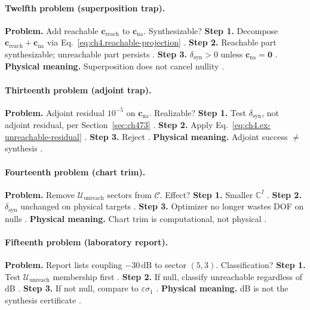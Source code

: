 \paragraph{Twelfth problem (superposition trap).}
\textbf{Problem.} Add reachable \(\mathbf{c}_{\mathrm{reach}}\) to \(\mathbf{c}_{\mathrm{na}}\). Synthesizable?
\textbf{Step 1.} Decompose \(\mathbf{c}_{\mathrm{reach}}+\mathbf{c}_{\mathrm{na}}\) via Eq.~\eqref{eq:ch4.reachable-projection} \cite{harrington2001,stratton1941}.
\textbf{Step 2.} Reachable part synthesizable; unreachable part persists \cite{devaney2004,hansen1988}.
\textbf{Step 3.} \(\delta_{\mathrm{syn}}>0\) unless \(\mathbf{c}_{\mathrm{na}}=\mathbf{0}\) \cite{jackson1999,harrington2001}.
\textbf{Physical meaning.} Superposition does not cancel nullity \cite{stratton1941,devaney2004}.

\paragraph{Thirteenth problem (adjoint trap).}
\textbf{Problem.} Adjoint residual \(10^{-5}\) on \(\mathbf{c}_{\mathrm{na}}\). Realizable?
\textbf{Step 1.} Test \(\delta_{\mathrm{syn}}\), not adjoint residual, per Section~\ref{sec:ch473} \cite{harrington2001,stratton1941}.
\textbf{Step 2.} Apply Eq.~\eqref{eq:ch4.ex-unreachable-residual} \cite{devaney2004,hansen1988}.
\textbf{Step 3.} Reject \cite{jackson1999,harrington2001,stratton1941}.
\textbf{Physical meaning.} Adjoint success \(\neq\) synthesis \cite{devaney2004,hansen1988}.

\paragraph{Fourteenth problem (chart trim).}
\textbf{Problem.} Remove \(\mathcal{U}_{\mathrm{unreach}}\) sectors from \(\mathcal{C}\). Effect?
\textbf{Step 1.} Smaller \(\mathbb{C}^{I}\) \cite{harrington2001,stratton1941,hansen1988}.
\textbf{Step 2.} \(\delta_{\mathrm{syn}}\) unchanged on physical targets \cite{devaney2004,jackson1999}.
\textbf{Step 3.} Optimizer no longer wastes DOF on nulls \cite{harrington2001,stratton1941,hansen1988}.
\textbf{Physical meaning.} Chart trim is computational, not physical \cite{devaney2004,jackson1999}.

\paragraph{Fifteenth problem (laboratory report).}
\textbf{Problem.} Report lists coupling \(-30\,\mathrm{dB}\) to sector \((5,3)\). Classification?
\textbf{Step 1.} Test \(\mathcal{U}_{\mathrm{unreach}}\) membership first \cite{harrington2001,stratton1941,hansen1988}.
\textbf{Step 2.} If null, classify unreachable regardless of dB \cite{devaney2004,jackson1999}.
\textbf{Step 3.} If not null, compare to \(\varepsilon\sigma_{1}\) \cite{harrington2001,stratton1941,hansen1988}.
\textbf{Physical meaning.} dB is not the synthesis certificate \cite{devaney2004,jackson1999}.

